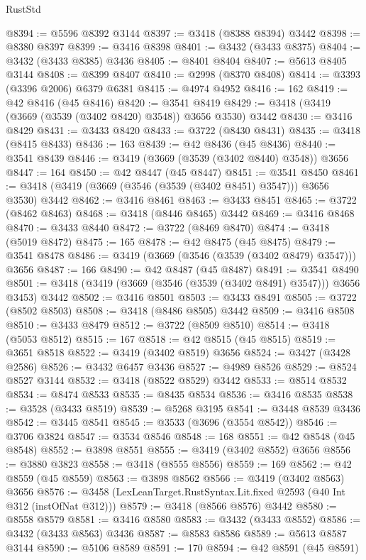 \begin{lexlean}{RustStd}
\begin{coremodule}
@8394 := @5596 @8392 @3144
@8397 := @3418 (@8388 @8394) @3442
@8398 := @8380 @8397
@8399 := @3416 @8398
@8401 := @3432 (@3433 @8375)
@8404 := @3432 (@3433 @8385) @3436
@8405 := @8401 @8404
@8407 := @5613 @8405 @3144
@8408 := @8399 @8407
@8410 := @2998 (@8370 @8408)
@8414 := @3393 (@3396 @2006) @6379 @6381
@8415 := @4974 @4952
@8416 := 162
@8419 := @42 @8416 (@45 @8416)
@8420 := @3541 @8419
@8429 := @3418 (@3419 (@3669 (@3539 (@3402 @8420) @3548)) @3656 @3530) @3442
@8430 := @3416 @8429
@8431 := @3433 @8420
@8433 := @3722 (@8430 @8431)
@8435 := @3418 (@8415 @8433)
@8436 := 163
@8439 := @42 @8436 (@45 @8436)
@8440 := @3541 @8439
@8446 := @3419 (@3669 (@3539 (@3402 @8440) @3548)) @3656
@8447 := 164
@8450 := @42 @8447 (@45 @8447)
@8451 := @3541 @8450
@8461 := @3418 (@3419 (@3669 (@3546 (@3539 (@3402 @8451) @3547))) @3656 @3530) @3442
@8462 := @3416 @8461
@8463 := @3433 @8451
@8465 := @3722 (@8462 @8463)
@8468 := @3418 (@8446 @8465) @3442
@8469 := @3416 @8468
@8470 := @3433 @8440
@8472 := @3722 (@8469 @8470)
@8474 := @3418 (@5019 @8472)
@8475 := 165
@8478 := @42 @8475 (@45 @8475)
@8479 := @3541 @8478
@8486 := @3419 (@3669 (@3546 (@3539 (@3402 @8479) @3547))) @3656
@8487 := 166
@8490 := @42 @8487 (@45 @8487)
@8491 := @3541 @8490
@8501 := @3418 (@3419 (@3669 (@3546 (@3539 (@3402 @8491) @3547))) @3656 @3453) @3442
@8502 := @3416 @8501
@8503 := @3433 @8491
@8505 := @3722 (@8502 @8503)
@8508 := @3418 (@8486 @8505) @3442
@8509 := @3416 @8508
@8510 := @3433 @8479
@8512 := @3722 (@8509 @8510)
@8514 := @3418 (@5053 @8512)
@8515 := 167
@8518 := @42 @8515 (@45 @8515)
@8519 := @3651 @8518
@8522 := @3419 (@3402 @8519) @3656
@8524 := @3427 (@3428 @2586)
@8526 := @3432 @6457 @3436
@8527 := @4989 @8526
@8529 := @8524 @8527 @3144
@8532 := @3418 (@8522 @8529) @3442
@8533 := @8514 @8532
@8534 := @8474 @8533
@8535 := @8435 @8534
@8536 := @3416 @8535
@8538 := @3528 (@3433 @8519)
@8539 := @5268 @3195
@8541 := @3448 @8539 @3436
@8542 := @3445 @8541
@8545 := @3533 (@3696 (@3554 @8542))
@8546 := @3706 @3824
@8547 := @3534 @8546
@8548 := 168
@8551 := @42 @8548 (@45 @8548)
@8552 := @3898 @8551
@8555 := @3419 (@3402 @8552) @3656
@8556 := @3880 @3823
@8558 := @3418 (@8555 @8556)
@8559 := 169
@8562 := @42 @8559 (@45 @8559)
@8563 := @3898 @8562
@8566 := @3419 (@3402 @8563) @3656
@8576 := @3458 (LexLeanTarget.RustSyntax.Lit.fixed @2593 (@40 Int @312 (instOfNat @312)))
@8579 := @3418 (@8566 @8576) @3442
@8580 := @8558 @8579
@8581 := @3416 @8580
@8583 := @3432 (@3433 @8552)
@8586 := @3432 (@3433 @8563) @3436
@8587 := @8583 @8586
@8589 := @5613 @8587 @3144
@8590 := @5106 @8589
@8591 := 170
@8594 := @42 @8591 (@45 @8591)

\end{coremodule}
\end{lexlean}
